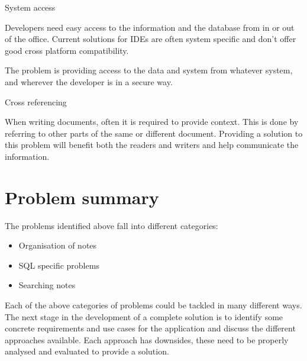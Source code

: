 \begin{problem}{System access}

Developers need easy access to the information and the database from in or out
of the office. Current solutions for IDEs are often system specific and
don't offer good cross platform compatibility.

The problem is providing access to the data and system from whatever
system, and wherever the developer is in a secure way.
\end{problem}

\begin{problem}{Cross referencing}

When writing documents, often it is required to provide context. This is done
by referring to other parts of the same or different document. Providing a
solution to this problem will benefit both the readers and writers and help
communicate the information.

\end{problem}

\section{Problem summary}\label{summary-of-identified-problems}

The problems identified above fall into different categories:

\begin{itemize}
\tightlist
\item
  Organisation of notes
\item
  SQL specific problems
\item
  Searching notes
\end{itemize}

Each of the above categories of problems could be tackled in many different
ways. The next stage in the development of a complete solution is to identify
some concrete requirements and use cases for the application and discuss the
different approaches available. Each approach has downsides, these need to be
properly analysed and evaluated to provide a solution.
